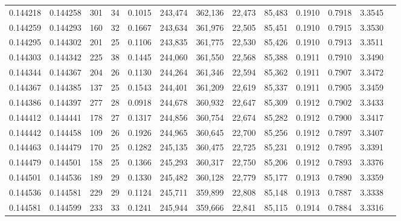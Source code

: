 \begin{tabular}{rrrrrrrrrrrrr}
0.144218 & 0.144258 &   301 &  34 &                                     0.1015 & 243,474 & 362,136 &  22,473 &  85,483 & 0.1910 & 0.7918 & 3.3545 \\
0.144259 & 0.144293 &   160 &  32 &                                     0.1667 & 243,634 & 361,976 &  22,505 &  85,451 & 0.1910 & 0.7915 & 3.3530 \\
0.144295 & 0.144302 &   201 &  25 &                                     0.1106 & 243,835 & 361,775 &  22,530 &  85,426 & 0.1910 & 0.7913 & 3.3511 \\
0.144303 & 0.144342 &   225 &  38 &                                     0.1445 & 244,060 & 361,550 &  22,568 &  85,388 & 0.1911 & 0.7910 & 3.3490 \\
0.144344 & 0.144367 &   204 &  26 &                                     0.1130 & 244,264 & 361,346 &  22,594 &  85,362 & 0.1911 & 0.7907 & 3.3472 \\
0.144367 & 0.144385 &   137 &  25 &                                     0.1543 & 244,401 & 361,209 &  22,619 &  85,337 & 0.1911 & 0.7905 & 3.3459 \\
0.144386 & 0.144397 &   277 &  28 &                                     0.0918 & 244,678 & 360,932 &  22,647 &  85,309 & 0.1912 & 0.7902 & 3.3433 \\
0.144412 & 0.144441 &   178 &  27 &                                     0.1317 & 244,856 & 360,754 &  22,674 &  85,282 & 0.1912 & 0.7900 & 3.3417 \\
0.144442 & 0.144458 &   109 &  26 &                                     0.1926 & 244,965 & 360,645 &  22,700 &  85,256 & 0.1912 & 0.7897 & 3.3407 \\
0.144463 & 0.144479 &   170 &  25 &                                     0.1282 & 245,135 & 360,475 &  22,725 &  85,231 & 0.1912 & 0.7895 & 3.3391 \\
0.144479 & 0.144501 &   158 &  25 &                                     0.1366 & 245,293 & 360,317 &  22,750 &  85,206 & 0.1912 & 0.7893 & 3.3376 \\
0.144501 & 0.144536 &   189 &  29 &                                     0.1330 & 245,482 & 360,128 &  22,779 &  85,177 & 0.1913 & 0.7890 & 3.3359 \\
0.144536 & 0.144581 &   229 &  29 &                                     0.1124 & 245,711 & 359,899 &  22,808 &  85,148 & 0.1913 & 0.7887 & 3.3338 \\
0.144581 & 0.144599 &   233 &  33 &                                     0.1241 & 245,944 & 359,666 &  22,841 &  85,115 & 0.1914 & 0.7884 & 3.3316 \\

\end{tabular}
